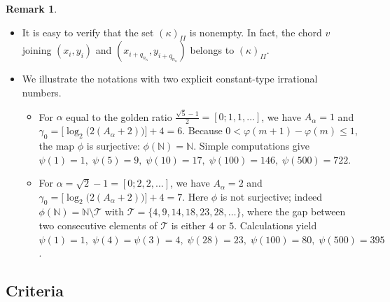 \documentclass{amsart}
\newcounter{item}[section]
\theoremstyle{definition}
\newtheorem{Remark}[Definition]{Remark}
\begin{document}
\begin{Remark}\label{RGX}
	\begin{itemize}
		\
		\item It is easy to verify that the set $(\kappa)_{II}$ is nonempty. In fact, the chord $v$ joining $(x_i, y_i)$ and $(x_{i+q_{n_{\kappa}}}, y_{i+q_{n_{\kappa}}})$ belongs to $(\kappa)_{II}$.
		
		\item We illustrate the notations with two explicit constant-type irrational numbers.
		
		\begin{itemize}
			\item For $\alpha$ equal to the golden ratio \(\displaystyle \frac{\sqrt{5}-1}{2}=[0;1,1,\dots]\), we have \(A_\alpha=1\) and \(\gamma_{0}= \bigl[\log_2\bigl(2(A_\alpha+2)\bigr)\bigr]+4 = 6\). Because \(0<\varphi(m+1)-\varphi(m)\le 1\), the map \(\phi\) is surjective: \(\phi(\mathbb N)=\mathbb N\). Simple computations give \(\psi(1)=1,\;\psi(5)=9,\;\psi(10)=17,\;\psi(100)=146,\;\psi(500)=722\).
			
			\item For $\alpha=\sqrt{2}-1=[0;2,2,\dots]$, we have \(A_\alpha=2\) and \(\gamma_{0}= \bigl[\log_2\bigl(2(A_\alpha+2)\bigr)\bigr]+4 = 7\). Here \(\phi\) is not surjective; indeed \(\phi(\mathbb N)=\mathbb N\setminus \mathcal{T}\) with \(\mathcal{T}=\{4,9,14,18,23,28,\dots\}\), where the gap between two consecutive elements of \(\mathcal{T}\) is either \(4\) or \(5\). Calculations yield \(\psi(1)=1,\;\psi(4)=\psi(3)=4,\;\psi(28)=23,\;\psi(100)=80,\;\psi(500)=395\).
		\end{itemize}
	\end{itemize}
\end{Remark}





\subsection{Criteria}
\end{document}
